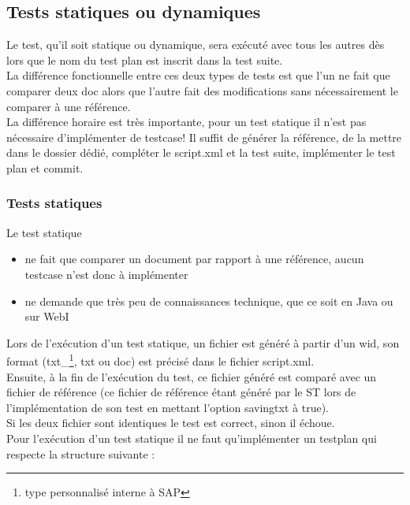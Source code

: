 \subsection{Tests statiques ou dynamiques}

Le test, qu'il soit statique ou dynamique, sera exécuté avec tous les autres dès lors que le nom du test plan est inscrit dans la test suite.\\
La différence fonctionnelle entre ces deux types de tests est que l'un ne fait que comparer deux doc alors que l'autre fait des modifications sans nécessairement le comparer à une référence.\\
La différence horaire est très importante, pour un test statique il n'est pas nécessaire d'implémenter de testcase! Il suffit de générer la référence, de la mettre dans le dossier dédié, compléter le script.xml et la test suite, implémenter le test plan et commit. 

\subsubsection{Tests statiques}
Le test statique

\begin{itemize}
	\item ne fait que comparer un document par rapport \`{a} une r\'{e}f\'{e}rence, aucun testcase n'est donc \`{a} impl\'{e}menter
	\item ne demande que très peu de connaissances technique, que ce soit en Java ou sur WebI
\end{itemize}

Lors de l'ex\'{e}cution d'un test statique, un fichier est g\'{e}n\'{e}r\'{e} \`{a} partir d'un wid, son format (txt\_\footnote{type personnalis\'{e} interne \`{a} SAP}, txt ou doc) est pr\'{e}cis\'{e} dans le fichier script.xml.\\
Ensuite, à la fin de l'ex\'{e}cution du test, ce fichier g\'{e}n\'{e}r\'{e} est compar\'{e} avec un fichier de r\'{e}f\'{e}rence (ce fichier de r\'{e}f\'{e}rence \'{e}tant g\'{e}n\'{e}r\'{e} par le ST lors de l'impl\'{e}mentation de son test en mettant l'option savingtxt à true).\\
Si les deux fichier sont identiques le test est correct, sinon il \'{e}choue.\\
Pour l'exécution d'un test statique il ne faut qu'implémenter un testplan qui respecte la structure suivante :






